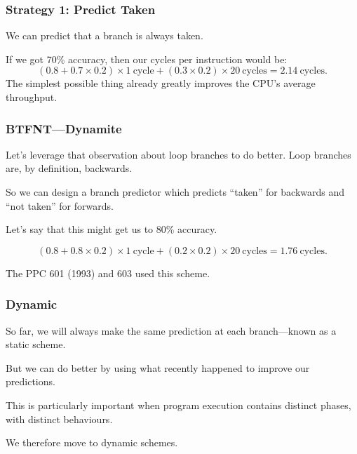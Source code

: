 \begin{frame}
\frametitle{Strategy 1: Predict Taken}

We can predict that a branch is always taken. 

If we got 70\% accuracy, then our cycles per instruction would be:
\[
(0.8 + 0.7 \times 0.2) \times 1 \mathrm{~cycle} + (0.3 \times 0.2) \times 20 \mathrm{~cycles} = 2.14 \mathrm{~cycles}.
\]
The simplest possible thing already greatly improves the CPU's average throughput.

\end{frame}



\begin{frame}
\frametitle{BTFNT---Dynamite}

Let's leverage that observation about loop branches to do better.
Loop branches are, by definition, backwards. 

So we can design a branch predictor which predicts ``taken''
for backwards and ``not taken'' for forwards. 

Let's say that this might get us to 80\% accuracy. 

\[
(0.8 + 0.8 \times 0.2) \times 1 \mathrm{~cycle} + (0.2 \times 0.2) \times 20 \mathrm{~cycles} = 1.76 \mathrm{~cycles}.
\]

The PPC 601 (1993) and 603 used this scheme.

\end{frame}


\begin{frame}
\frametitle{Dynamic}

So far, we will always make the same prediction at each branch---known as a
\alert{static} scheme. 

But we can do better by using what recently happened to
improve our predictions. 

This is particularly important when program execution
contains distinct phases, with distinct behaviours.


We therefore move to \alert{dynamic} schemes.

\end{frame}



